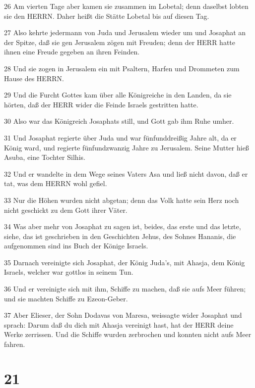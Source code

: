 \par 26 Am vierten Tage aber kamen sie zusammen im Lobetal; denn daselbst lobten sie den HERRN. Daher heißt die Stätte Lobetal bis auf diesen Tag.
\par 27 Also kehrte jedermann von Juda und Jerusalem wieder um und Josaphat an der Spitze, daß sie gen Jerusalem zögen mit Freuden; denn der HERR hatte ihnen eine Freude gegeben an ihren Feinden.
\par 28 Und sie zogen in Jerusalem ein mit Psaltern, Harfen und Drommeten zum Hause des HERRN.
\par 29 Und die Furcht Gottes kam über alle Königreiche in den Landen, da sie hörten, daß der HERR wider die Feinde Israels gestritten hatte.
\par 30 Also war das Königreich Josaphats still, und Gott gab ihm Ruhe umher.
\par 31 Und Josaphat regierte über Juda und war fünfunddreißig Jahre alt, da er König ward, und regierte fünfundzwanzig Jahre zu Jerusalem. Seine Mutter hieß Asuba, eine Tochter Silhis.
\par 32 Und er wandelte in dem Wege seines Vaters Asa und ließ nicht davon, daß er tat, was dem HERRN wohl gefiel.
\par 33 Nur die Höhen wurden nicht abgetan; denn das Volk hatte sein Herz noch nicht geschickt zu dem Gott ihrer Väter.
\par 34 Was aber mehr von Josaphat zu sagen ist, beides, das erste und das letzte, siehe, das ist geschrieben in den Geschichten Jehus, des Sohnes Hananis, die aufgenommen sind ins Buch der Könige Israels.
\par 35 Darnach vereinigte sich Josaphat, der König Juda's, mit Ahasja, dem König Israels, welcher war gottlos in seinem Tun.
\par 36 Und er vereinigte sich mit ihm, Schiffe zu machen, daß sie aufs Meer führen; und sie machten Schiffe zu Ezeon-Geber.
\par 37 Aber Elieser, der Sohn Dodavas von Maresa, weissagte wider Josaphat und sprach: Darum daß du dich mit Ahasja vereinigt hast, hat der HERR deine Werke zerrissen. Und die Schiffe wurden zerbrochen und konnten nicht aufs Meer fahren.

\chapter{21}


